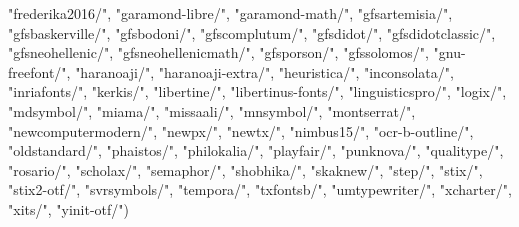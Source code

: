 \documentclass[
]{article}
\newenvironment{Shaded}{\begin{snugshade}}{\end{snugshade}}
\newcommand{\NormalTok}[1]{#1}
\newcommand{\StringTok}[1]{\textcolor[rgb]{0.31,0.60,0.02}{#1}}
\begin{document}
\begin{Shaded}
\begin{Highlighting}[]
  \StringTok{"frederika2016/"}\NormalTok{,}
  \StringTok{"garamond{-}libre/"}\NormalTok{,}
  \StringTok{"garamond{-}math/"}\NormalTok{,}
  \StringTok{"gfsartemisia/"}\NormalTok{,}
  \StringTok{"gfsbaskerville/"}\NormalTok{,}
  \StringTok{"gfsbodoni/"}\NormalTok{,}
  \StringTok{"gfscomplutum/"}\NormalTok{,}
  \StringTok{"gfsdidot/"}\NormalTok{,}
  \StringTok{"gfsdidotclassic/"}\NormalTok{,}
  \StringTok{"gfsneohellenic/"}\NormalTok{,}
  \StringTok{"gfsneohellenicmath/"}\NormalTok{,}
  \StringTok{"gfsporson/"}\NormalTok{,}
  \StringTok{"gfssolomos/"}\NormalTok{,}
  \StringTok{"gnu{-}freefont/"}\NormalTok{,}
  \StringTok{"haranoaji/"}\NormalTok{,}
  \StringTok{"haranoaji{-}extra/"}\NormalTok{,}
  \StringTok{"heuristica/"}\NormalTok{,}
  \StringTok{"inconsolata/"}\NormalTok{,}
  \StringTok{"inriafonts/"}\NormalTok{,}
  \StringTok{"kerkis/"}\NormalTok{,}
  \StringTok{"libertine/"}\NormalTok{,}
  \StringTok{"libertinus{-}fonts/"}\NormalTok{,}
  \StringTok{"linguisticspro/"}\NormalTok{,}
  \StringTok{"logix/"}\NormalTok{,}
  \StringTok{"mdsymbol/"}\NormalTok{,}
  \StringTok{"miama/"}\NormalTok{,}
  \StringTok{"missaali/"}\NormalTok{,}
  \StringTok{"mnsymbol/"}\NormalTok{,}
  \StringTok{"montserrat/"}\NormalTok{,}
  \StringTok{"newcomputermodern/"}\NormalTok{,}
  \StringTok{"newpx/"}\NormalTok{,}
  \StringTok{"newtx/"}\NormalTok{,}
  \StringTok{"nimbus15/"}\NormalTok{,}
  \StringTok{"ocr{-}b{-}outline/"}\NormalTok{,}
  \StringTok{"oldstandard/"}\NormalTok{,}
  \StringTok{"phaistos/"}\NormalTok{,}
  \StringTok{"philokalia/"}\NormalTok{,}
  \StringTok{"playfair/"}\NormalTok{,}
  \StringTok{"punknova/"}\NormalTok{,}
  \StringTok{"qualitype/"}\NormalTok{,}
  \StringTok{"rosario/"}\NormalTok{,}
  \StringTok{"scholax/"}\NormalTok{,}
  \StringTok{"semaphor/"}\NormalTok{,}
  \StringTok{"shobhika/"}\NormalTok{,}
  \StringTok{"skaknew/"}\NormalTok{,}
  \StringTok{"step/"}\NormalTok{,}
  \StringTok{"stix/"}\NormalTok{,}
  \StringTok{"stix2{-}otf/"}\NormalTok{,}
  \StringTok{"svrsymbols/"}\NormalTok{,}
  \StringTok{"tempora/"}\NormalTok{,}
  \StringTok{"txfontsb/"}\NormalTok{,}
  \StringTok{"umtypewriter/"}\NormalTok{,}
  \StringTok{"xcharter/"}\NormalTok{,}
  \StringTok{"xits/"}\NormalTok{,}
  \StringTok{"yinit{-}otf/"}\NormalTok{)}
 
\end{Highlighting}
\end{Shaded}
\end{document}
